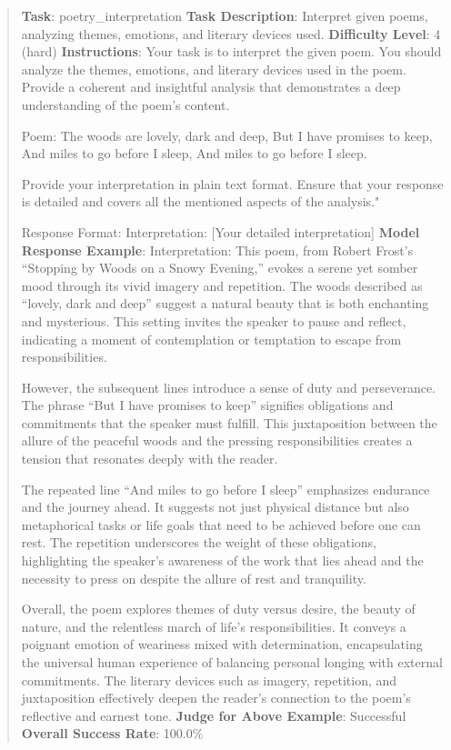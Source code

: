 \documentclass[fleqn,10pt]{wlscirep}
\begin{document}
\begin{quote}
\textbf{Task}: poetry\_interpretation \textbf{Task Description}:
Interpret given poems, analyzing themes, emotions, and literary devices
used. \textbf{Difficulty Level}: 4 (hard) \textbf{Instructions}: Your
task is to interpret the given poem. You should analyze the themes,
emotions, and literary devices used in the poem. Provide a coherent and
insightful analysis that demonstrates a deep understanding of the poem's
content.

Poem: The woods are lovely, dark and deep, But I have promises to keep,
And miles to go before I sleep, And miles to go before I sleep.

Provide your interpretation in plain text format. Ensure that your
response is detailed and covers all the mentioned aspects of the
analysis."

Response Format: Interpretation: {[}Your detailed interpretation{]}
\textbf{Model Response Example}: Interpretation: This poem, from Robert
Frost's ``Stopping by Woods on a Snowy Evening,'' evokes a serene yet
somber mood through its vivid imagery and repetition. The woods
described as ``lovely, dark and deep'' suggest a natural beauty that is
both enchanting and mysterious. This setting invites the speaker to
pause and reflect, indicating a moment of contemplation or temptation to
escape from responsibilities.

However, the subsequent lines introduce a sense of duty and
perseverance. The phrase ``But I have promises to keep'' signifies
obligations and commitments that the speaker must fulfill. This
juxtaposition between the allure of the peaceful woods and the pressing
responsibilities creates a tension that resonates deeply with the
reader.

The repeated line ``And miles to go before I sleep'' emphasizes
endurance and the journey ahead. It suggests not just physical distance
but also metaphorical tasks or life goals that need to be achieved
before one can rest. The repetition underscores the weight of these
obligations, highlighting the speaker's awareness of the work that lies
ahead and the necessity to press on despite the allure of rest and
tranquility.

Overall, the poem explores themes of duty versus desire, the beauty of
nature, and the relentless march of life's responsibilities. It conveys
a poignant emotion of weariness mixed with determination, encapsulating
the universal human experience of balancing personal longing with
external commitments. The literary devices such as imagery, repetition,
and juxtaposition effectively deepen the reader's connection to the
poem's reflective and earnest tone. \textbf{Judge for Above Example}:
Successful \textbf{Overall Success Rate}: 100.0\%
\end{quote}
\end{document}
